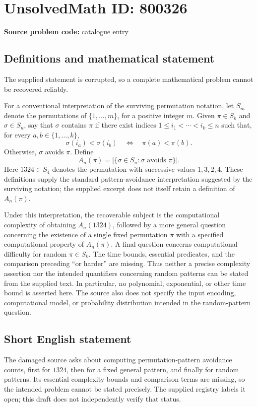 \documentclass[11pt]{article}
\begin{document}
\section*{UnsolvedMath ID: 800326}
\textbf{Source problem code:} catalogue entry
\subsection{Definitions and mathematical statement}
The supplied statement is corrupted, so a complete mathematical problem cannot be recovered reliably.

For a conventional interpretation of the surviving permutation notation, let \(S_m\) denote the permutations of \(\{1,\ldots,m\}\), for a positive integer \(m\). Given \(\pi\in S_k\) and \(\sigma\in S_n\), say that \(\sigma\) contains \(\pi\) if there exist indices \(1\le i_1<\cdots<i_k\le n\) such that, for every \(a,b\in\{1,\ldots,k\}\),
\[
\sigma(i_a)<\sigma(i_b)\quad\Longleftrightarrow\quad\pi(a)<\pi(b).
\]
Otherwise, \(\sigma\) avoids \(\pi\). Define
\[
A_n(\pi)=\bigl|\{\sigma\in S_n:\sigma\text{ avoids }\pi\}\bigr|.
\]
Here \(1324\in S_4\) denotes the permutation with successive values \(1,3,2,4\). These definitions supply the standard pattern-avoidance interpretation suggested by the surviving notation; the supplied excerpt does not itself retain a definition of \(A_n(\pi)\).

Under this interpretation, the recoverable subject is the computational complexity of obtaining \(A_n(1324)\), followed by a more general question concerning the existence of a single fixed permutation \(\pi\) with a specified computational property of \(A_n(\pi)\). A final question concerns computational difficulty for random \(\pi\in S_k\). The time bounds, essential predicates, and the comparison preceding ``or harder'' are missing. Thus neither a precise complexity assertion nor the intended quantifiers concerning random patterns can be stated from the supplied text. In particular, no polynomial, exponential, or other time bound is asserted here. The source also does not specify the input encoding, computational model, or probability distribution intended in the random-pattern question.
\subsection{Short English statement}
The damaged source asks about computing permutation-pattern avoidance counts, first for \(1324\), then for a fixed general pattern, and finally for random patterns. Its essential complexity bounds and comparison terms are missing, so the intended problem cannot be stated precisely. The supplied registry labels it open; this draft does not independently verify that status.
\end{document}
